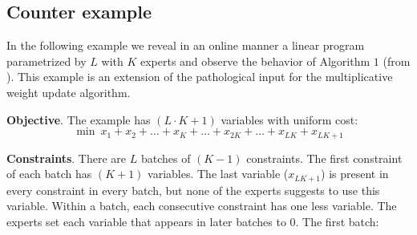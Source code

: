 \subsection{Counter example}

In the following example we reveal in an online manner a linear program parametrized by $L$ with $K$ experts and observe the behavior of Algorithm $1$ (from \cite{AnandGe22:Online-Algorithms}). This example is an extension of the pathological input for the multiplicative weight update algorithm.

\medskip

\noindent \textbf{Objective}. The example has $(L \cdot K + 1)$ variables with uniform cost:
\[ \min\ x_1 + x_2 + \dots + x_{K} + \dots + x_{2K} + \dots + x_{LK} + x_{LK+1}\]

\noindent \textbf{Constraints}. There are $L$ batches of $(K - 1)$ constraints. The first constraint of each batch has $(K+1)$ variables. The last variable ($x_{LK+1}$) is present in every constraint in every batch, but none of the experts suggests to use this variable. Within a batch, each consecutive constraint has one less variable. The experts set each variable that appears in later batches to $0$. The first batch:
%
